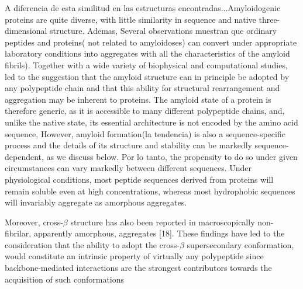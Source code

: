 A diferencia de esta similitud en las estructuras encontradas...Amyloidogenic proteins are quite diverse, with little similarity in sequence and native three-dimensional structure.
Ademas, Several observations muestran que ordinary peptides and proteins( not related to amyloidoses) can convert under appropriate laboratory conditions into aggregates with all the characteristics of the amyloid fibrils).
Together with a wide variety of biophysical and computational studies, 
led to the suggestion that the amyloid structure can in principle be adopted by any polypeptide chain and that this ability for structural rearrangement and aggregation may be inherent to proteins.
\cite{fandrich2002behaviour}
The amyloid state of a protein is therefore generic, as it is accessible to many different polypeptide chains, and, unlike the native state, its essential architecture is not encoded by the amino acid sequence,
However, amyloid formation(la tendencia) is also a sequence-specific process and the details of its structure and stability can be markedly sequence-dependent, as we discuss below.
Por lo tanto, the propensity to do so under given circumstances can vary markedly between different sequences.
Under physiological conditions, most peptide sequences derived from proteins will remain soluble even at high concentrations, whereas most hydrophobic sequences will invariably aggregate as amorphous aggregates.

Moreover, cross-$\beta$ structure has also been reported in macroscopically non-fibrilar, apparently amorphous, aggregates [18]. These findings have led to the consideration
that the ability to adopt the cross-$\beta$ supersecondary conformation, would constitute an intrinsic property of virtually any polypeptide since backbone-mediated
interactions are the strongest contributors towards the acquisition of such conformations











% 
% 
% 


